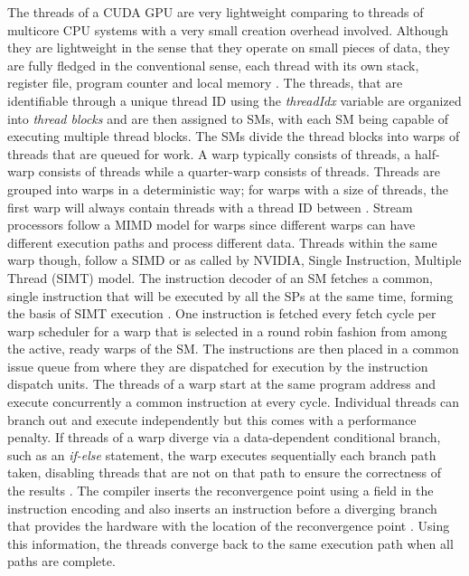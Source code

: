 \documentclass{ws-ijait}
\begin{document}
The threads of a CUDA GPU are very lightweight comparing to threads of multicore CPU systems with a very small creation overhead involved. Although they are lightweight in the sense that they operate on small pieces of data, they are fully fledged in the conventional sense, each thread with its own stack, register file, program counter and local memory \cite{Halfhill2008}. The threads, that are identifiable through a unique thread ID using the \textit{threadIdx} variable are organized into \textit{thread blocks} and are then assigned to SMs, with each SM being capable of executing multiple thread blocks. The SMs divide the thread blocks into warps of threads that are queued for work. A warp typically consists of  threads, a half-warp consists of  threads while a quarter-warp consists of  threads. Threads are grouped into warps in a deterministic way; for warps with a size of  threads, the first warp will always contain threads with a thread ID between . Stream processors follow a MIMD model for warps since different warps can have different execution paths and process different data. Threads within the same warp though, follow a SIMD or as called by NVIDIA, Single Instruction, Multiple Thread (SIMT) model. The instruction decoder of an SM fetches a common, single instruction that will be executed by all the SPs at the same time, forming the basis of SIMT execution \cite{Lakshminarayana2010}. One instruction is fetched every fetch cycle per warp scheduler for a warp that is selected in a round robin fashion from among the active, ready warps of the SM. The instructions are then placed in a common issue queue from where they are dispatched for execution by the instruction dispatch units. The threads of a warp start at the same program address and execute concurrently a common instruction at every cycle. Individual threads can branch out and execute independently but this comes with a performance penalty. If threads of a warp diverge via a data-dependent conditional branch, such as an \textit{if-else} statement, the warp executes sequentially each branch path taken, disabling threads that are not on that path to ensure the correctness of the results \cite{CUDA_SDK}. The compiler inserts the reconvergence point using a field in the instruction encoding and also inserts an instruction before a diverging branch that provides the hardware with the location of the reconvergence point \cite{Papadopoulou2009}. Using this information, the threads converge back to the same execution path when all paths are complete. 
\end{document}
